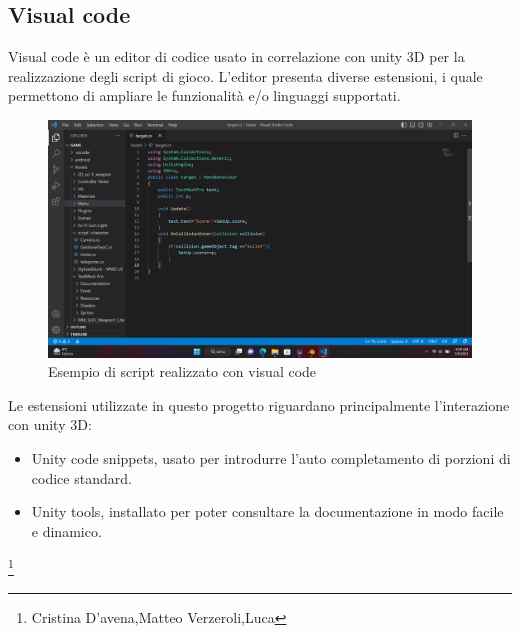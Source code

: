 \documentclass[10pt,a4paper]{article}
\begin{document}
	\subsection{Visual code}
	Visual code è un editor di codice usato in correlazione con unity 3D per la realizzazione degli script di gioco.
	L'editor presenta diverse estensioni, i quale permettono di ampliare le funzionalità e/o linguaggi supportati.
	 \begin{figure}[H]
		\centering
		\includegraphics[width=0.7\linewidth]{image/visual_code}
		\caption{Esempio di script realizzato con visual code}
		\label{fig:visual_code}
	\end{figure}
    Le estensioni utilizzate in questo progetto riguardano principalmente l'interazione con unity 3D:
    \begin{itemize}
    	\item Unity code snippets, usato per introdurre l'auto completamento di porzioni di codice standard.
    	\item Unity tools, installato per poter consultare la documentazione in modo facile e dinamico. 
    \end{itemize}
    \newpage
    \null
    \newpage
	\thanks{Cristina D'avena,Matteo Verzeroli,Luca }
\end{document}
